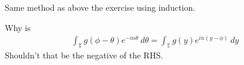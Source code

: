 \begin{exercise}
  Same method as above the exercise using induction.
\end{exercise}

\begin{corollary}
  Why is
  \begin{align*}
    \int_{\mathbb{T}}  g(\phi - \theta) e^{-i n \theta} \ d \theta  =
    \int_{\mathbb{T}}  g(y) e^{in(y - \phi)} \ d  y
  \end{align*}
  Shouldn't that be the negative of the RHS.
\end{corollary}
%

